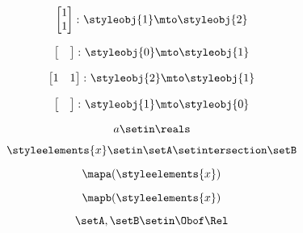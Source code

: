 {\begin{forslides}
    \begin{equation}
        \label{eq:parallelism-111}
        \begin{bmatrix}
            1 \\
            1
        \end{bmatrix}
        \colon \styleobj{1} \mto \styleobj{2}
    \end{equation}

    \begin{equation}
        \label{eq:parallelism-112}
        \begin{bmatrix}
            \quad
        \end{bmatrix}
        \colon \styleobj{0} \mto \styleobj{1}
    \end{equation}

    \begin{equation}
        \label{eq:parallelism-113}
        \begin{bmatrix}
            1 & 1
        \end{bmatrix}
        \colon \styleobj{2} \mto \styleobj{1}
    \end{equation}

    \begin{equation}
        \label{eq:parallelism-114}
        \begin{bmatrix}
            \quad
        \end{bmatrix}
        \colon \styleobj{1} \mto \styleobj{0}
    \end{equation}

    \begin{equation}
        \label{eq:parallelism-115}
        a \setin \reals
    \end{equation}


    \begin{equation}
        \label{eq:parallelism-116}
        \styleelements{x}\setin \setA\setintersection \setB
    \end{equation}

    \begin{equation}
        \label{eq:parallelism-117}
        \mapa(\styleelements{x})
    \end{equation}

    \begin{equation}
        \label{eq:parallelism-118}
        \mapb(\styleelements{x})
    \end{equation}

    \begin{equation}
        \label{eq:parallelism-119}
        \setA,\setB\setin \Obof\Rel
    \end{equation}


\end{forslides}}
